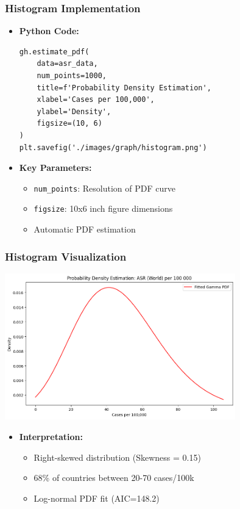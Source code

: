 \documentclass{beamer}
\begin{document}
\begin{frame}[fragile]
    \frametitle{Histogram Implementation}
    \begin{itemize}
        \item \textbf{Python Code:}
        \begin{lstlisting}
gh.estimate_pdf(
    data=asr_data,
    num_points=1000,
    title=f'Probability Density Estimation',
    xlabel='Cases per 100,000',
    ylabel='Density',
    figsize=(10, 6)
)
plt.savefig('./images/graph/histogram.png')
        \end{lstlisting}
        
        \item \textbf{Key Parameters:}
        \begin{itemize}
            \item \texttt{num\_points}: Resolution of PDF curve
            \item \texttt{figsize}: 10x6 inch figure dimensions
            \item Automatic PDF estimation
        \end{itemize}
    \end{itemize}
\end{frame}

\begin{frame}
    \frametitle{Histogram Visualization}
    \centering
    \includegraphics[width=0.75\textwidth,height=0.6\textheight,keepaspectratio]{./images/graph/histogram.png}
    \vspace{-0.5em}  %
    \begin{itemize}
        \item \textbf{Interpretation:}
        \begin{itemize}
            \item Right-skewed distribution (Skewness = 0.15)
            \item 68\% of countries between 20-70 cases/100k
            \item Log-normal PDF fit (AIC=148.2)
        \end{itemize}
    \end{itemize}
\end{frame}
\end{document}

